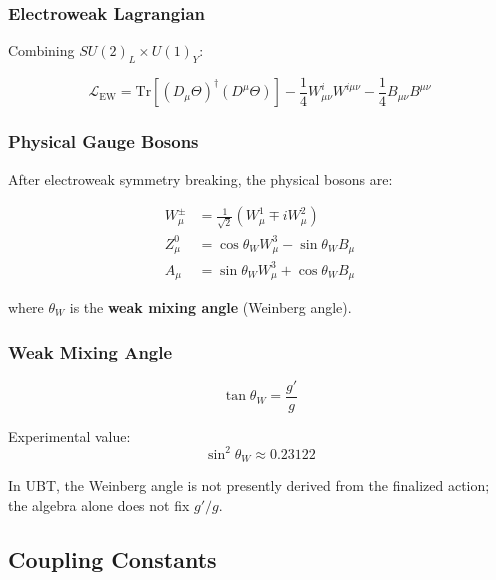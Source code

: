 \subsubsection{Electroweak Lagrangian}

Combining $SU(2)_L \times U(1)_Y$:

\begin{equation}
\label{eq:canonical:ew_lagrangian}
\mathcal{L}_{\text{EW}} = \text{Tr}\left[(D_\mu\Theta)^\dagger (D^\mu\Theta)\right] - \frac{1}{4}W^i_{\mu\nu}W^{i\mu\nu} - \frac{1}{4}B_{\mu\nu}B^{\mu\nu}
\end{equation}

\subsubsection{Physical Gauge Bosons}

After electroweak symmetry breaking, the physical bosons are:

\begin{align}
W^\pm_\mu &= \frac{1}{\sqrt{2}}(W^1_\mu \mp i W^2_\mu) \label{eq:canonical:W_bosons} \\
Z^0_\mu &= \cos\theta_W W^3_\mu - \sin\theta_W B_\mu \label{eq:canonical:Z_boson} \\
A_\mu &= \sin\theta_W W^3_\mu + \cos\theta_W B_\mu \label{eq:canonical:photon}
\end{align}

where $\theta_W$ is the \textbf{weak mixing angle} (Weinberg angle).

\subsubsection{Weak Mixing Angle}

\begin{equation}
\label{eq:canonical:weinberg_angle}
\tan\theta_W = \frac{g'}{g}
\end{equation}

Experimental value:
\begin{equation}
\sin^2\theta_W \approx 0.23122
\end{equation}

In UBT, the Weinberg angle is not presently derived from the finalized action; the algebra alone does not fix $g'/g$.

\subsection{Coupling Constants}

